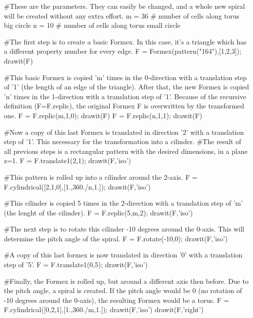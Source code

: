 \documentclass[a4paper]{manual}
\begin{document}
{{#These are the parameters. They can easily be changed, and a whole new spiral will be created without any extra effort.
m = 36 # number of cells along torus big circle
n = 10 # number of cells along torus small circle

#The first step is to create a basic Formex. In this case, it's a triangle which has a different property number for every edge.    
F = Formex(pattern("164"),[1,2,3]); drawit(F)

#This basic Formex is copied 'm' times in the 0-direction with a translation step of '1' (the length of an edge of the triangle). After that, the new Formex is copied 'n' times in the 1-direction with a translation step of '1'. Because of the recursive definition (F=F.replic), the original Formex F is overwritten by the transformed one.
F = F.replic(m,1,0); drawit(F)
F = F.replic(n,1,1); drawit(F)

#Now a copy of this last Formex is translated in direction '2' with a translation step of '1'. This necessary for the transformation into a cilinder.
#The result of all previous steps is a rectangular pattern with the desired dimensions, in a plane z=1.
F = F.translate1(2,1); drawit(F,'iso')

#This pattern is rolled up into a cilinder around the 2-axis. 
F = F.cylindrical([2,1,0],[1.,360./n,1.]); drawit(F,'iso')

#This cilinder is copied 5 times in the 2-direction with a translation step of 'm' (the lenght of the cilinder). 
F = F.replic(5,m,2); drawit(F,'iso')

#The next step is to rotate this cilinder -10 degrees around the 0-axis. This will determine the pitch angle of the spiral.
F = F.rotate(-10,0); drawit(F,'iso')

#A copy of this last formex is now translated in direction '0' with a translation step of '5'. 
F = F.translate1(0,5); drawit(F,'iso')

#Finally, the Formex is rolled up, but around a different axis then before. Due to the pitch angle, a spiral is created. If the pitch angle would be 0 (no rotation of -10 degrees around the 0-axis), the resulting Formex would be a torus. 
F = F.cylindrical([0,2,1],[1.,360./m,1.]); drawit(F,'iso')
drawit(F,'right')
}%
 


}
\end{document}
